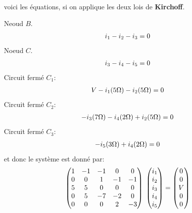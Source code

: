 \documentclass[letterpaper,10pt,english]{sphinxmanual}
\begin{document}
voici les équations, si on applique les deux lois de \textbf{Kirchoff}.

Neoud \(B\).
\begin{gather}
\begin{split}i_1-i_2-i_3=0\end{split}\notag
\end{gather}
Noeud \(C\).
\begin{gather}
\begin{split}i_3-i_4-i_5=0\end{split}\notag
\end{gather}
Circuit fermé \(C_1\):
\begin{gather}
\begin{split}V-i_1(5\Omega)-i_2(5\Omega)=0\end{split}\notag
\end{gather}
Circuit fermé \(C_2\):
\begin{gather}
\begin{split}-i_3(7\Omega)-i_4(2\Omega)+i_2(5\Omega)=0\end{split}\notag
\end{gather}
Circuit fermé \(C_3\):
\begin{gather}
\begin{split}-i_5(3\Omega)+i_4(2\Omega)=0\end{split}\notag
\end{gather}
et donc le système est donné par:
\begin{gather}
\begin{split}\begin{pmatrix}
  1 & -1 & -1 & 0 &0 \\
  0 & 0  &  1 & -1 & -1\\
  5 & 5  & 0  & 0  & 0 \\
  0 & 5  & -7 & -2 & 0\\
  0 & 0 &0    & 2 & -3\\
\end{pmatrix}
\;\begin{pmatrix}
   i_1\\
   i_2\\
   i_3\\
   i_4\\
   i_5
\end{pmatrix}=\begin{pmatrix}
   0\\
   0\\
   V\\
   0\\
   0
\end{pmatrix}\end{split}\notag
\end{gather}
\end{document}
